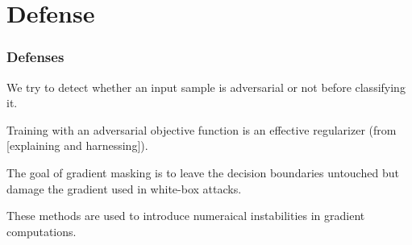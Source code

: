 \documentclass[9pt]{beamer}
\begin{document}
\section{Defense}

\begin{frame}
  \frametitle{Defenses}

  \begin{description}
  \item[Adversarial sample detection] We try to detect whether an
    input sample is adversarial or not before classifying it.
  \item Training with an adversarial objective function is an
    effective regularizer (from [explaining and harnessing]).
  \item[Gradient masking] The goal of gradient masking is to leave the
    decision boundaries untouched but damage the gradient used in
    white-box attacks.
  \item[Distillation and network saturation] These methods are used to
    introduce numeraical instabilities in gradient computations.
  \end{description}
\end{frame}
\end{document}
